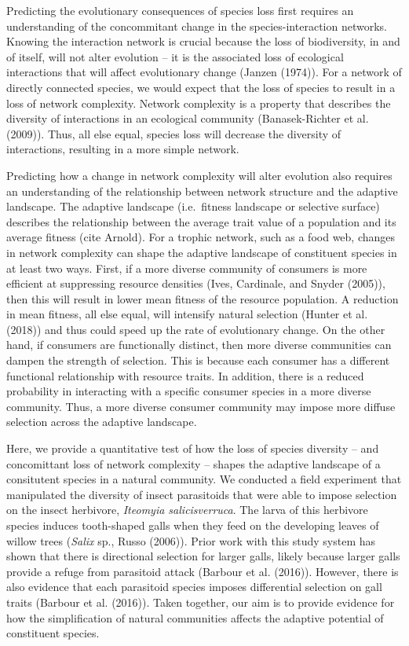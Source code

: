 \documentclass[]{elsarticle} %
\begin{document}
Predicting the evolutionary consequences of species loss first requires
an understanding of the concommitant change in the species-interaction
networks. Knowing the interaction network is crucial because the loss of
biodiversity, in and of itself, will not alter evolution -- it is the
associated loss of ecological interactions that will affect evolutionary
change (Janzen (1974)). For a network of directly connected species, we
would expect that the loss of species to result in a loss of network
complexity. Network complexity is a property that describes the
diversity of interactions in an ecological community (Banasek-Richter et
al. (2009)). Thus, all else equal, species loss will decrease the
diversity of interactions, resulting in a more simple network.

Predicting how a change in network complexity will alter evolution also
requires an understanding of the relationship between network structure
and the adaptive landscape. The adaptive landscape (i.e.~fitness
landscape or selective surface) describes the relationship between the
average trait value of a population and its average fitness (cite
Arnold). For a trophic network, such as a food web, changes in network
complexity can shape the adaptive landscape of constituent species in at
least two ways. First, if a more diverse community of consumers is more
efficient at suppressing resource densities (Ives, Cardinale, and Snyder
(2005)), then this will result in lower mean fitness of the resource
population. A reduction in mean fitness, all else equal, will intensify
natural selection (Hunter et al. (2018)) and thus could speed up the
rate of evolutionary change. On the other hand, if consumers are
functionally distinct, then more diverse communities can dampen the
strength of selection. This is because each consumer has a different
functional relationship with resource traits. In addition, there is a
reduced probability in interacting with a specific consumer species in a
more diverse community. Thus, a more diverse consumer community may
impose more diffuse selection across the adaptive landscape.

Here, we provide a quantitative test of how the loss of species
diversity -- and concomittant loss of network complexity -- shapes the
adaptive landscape of a consitutent species in a natural community. We
conducted a field experiment that manipulated the diversity of insect
parasitoids that were able to impose selection on the insect herbivore,
\emph{Iteomyia salicisverruca}. The larva of this herbivore species
induces tooth-shaped galls when they feed on the developing leaves of
willow trees (\emph{Salix} sp., Russo (2006)). Prior work with this
study system has shown that there is directional selection for larger
galls, likely because larger galls provide a refuge from parasitoid
attack (Barbour et al. (2016)). However, there is also evidence that
each parasitoid species imposes differential selection on gall traits
(Barbour et al. (2016)). Taken together, our aim is to provide evidence
for how the simplification of natural communities affects the adaptive
potential of constituent species.
\end{document}
